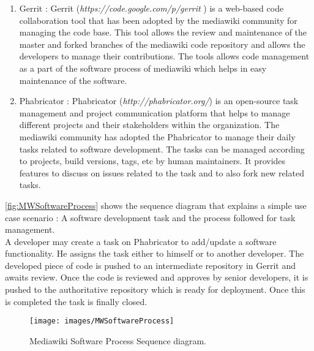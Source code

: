 \begin{enumerate}
\item Gerrit : Gerrit (\emph{https://code.google.com/p/gerrit }) is a web-based code collaboration tool that has been adopted by the mediawiki community for managing the code base. This tool allows the review and maintenance of the master and forked branches of the mediawiki code repository and allows the developers to manage their contributions. The tools allows code management as a part of the software process of mediawiki which helps in easy maintenance of the software. 
\item Phabricator : Phabricator (\emph{http://phabricator.org/}) is an open-source task management and project communication platform that helps to manage different projects and their stakeholders within the organization. The mediawiki community has adopted the Phabricator to manage their daily tasks related to software development. The tasks can be managed according to projects, build versions, tags, etc by human maintainers. It provides features to discuss on issues related to the task and to also fork new related tasks.
\end{enumerate}
\indent \autoref{fig:MWSoftwareProcess}  shows the sequence diagram that explains a simple use case scenario : A software development task and the process followed for task management. 
\\\indent A developer may create a task on Phabricator to add/update a software functionality. He assigns the task either to himself or to another developer. The developed piece of code is pushed to an intermediate repository in Gerrit and awaits review. Once the code is reviewed and approves by senior developers, it is pushed to the authoritative repository which is ready for deployment. Once this is completed the task is finally closed.  
\begin{figure}[H]
  \centering
  \texttt{[image: images/MWSoftwareProcess]}
  \caption[Current software maintenace process Sequence diagram]{Mediawiki Software Process Sequence diagram.}\label{fig:MWSoftwareProcess}
\end{figure}
